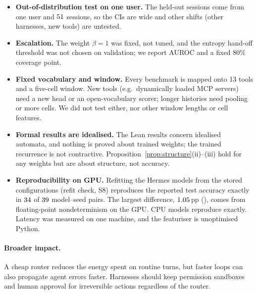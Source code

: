 \documentclass[10pt,twocolumn,letterpaper]{article}
\begin{document}
\begin{itemize}[leftmargin=1.2em, itemsep=0.1em]
  \item \textbf{Out-of-distribution test on one user.} The held-out sessions come from one user and $51$ sessions, so the CIs are wide and other shifts (other harnesses, new tools) are untested.
  \item \textbf{Escalation.} The weight $\beta{=}1$ was fixed, not tuned, and the entropy hand-off threshold was not chosen on validation; we report AUROC and a fixed 80\% coverage point.
  \item \textbf{Fixed vocabulary and window.} Every benchmark is mapped onto 13 tools and a five-cell window. New tools (e.g.\ dynamically loaded MCP servers) need a new head or an open-vocabulary scorer; longer histories need pooling or more cells. We did not test either, nor other window lengths or cell features.
  \item \textbf{Formal results are idealised.} The Lean results concern idealised automata, and nothing is proved about trained weights; the trained recurrence is not contractive. Proposition~\ref{prop:structure}(ii)--(iii) hold for any weights but are about structure, not accuracy.
  \item \textbf{Reproducibility on GPU.} Refitting the Hermes models from the stored configurations (refit check, S8) reproduces the reported test accuracy exactly in $34$ of $39$ model--seed pairs. The largest difference, $1.05$\,pp (\numRRefitMaxModel{}), comes from floating-point nondeterminism on the GPU. CPU models reproduce exactly. Latency was measured on one machine, and the featuriser is unoptimised Python.
\end{itemize}
\paragraph{Broader impact.} A cheap router reduces the energy spent on routine turns, but faster loops can also propagate agent errors faster. Harnesses should keep permission sandboxes and human approval for irreversible actions regardless of the router.
\end{document}
